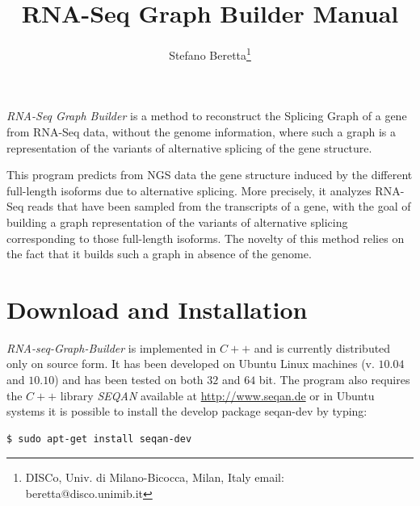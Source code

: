 \documentclass[11pt]{article}
\begin{document}
\newtheorem{theorem}{theorem}[section]
\newtheorem{lemma}[theorem]{Lemma}
\newtheorem{proposition}[theorem]{Proposition}
\newtheorem{observation}[theorem]{Observation}
\newtheorem{corollary}[theorem]{Corollary}
\newtheorem{claim}[theorem]{Claim}
\newtheorem{property}[theorem]{Property}
\theoremstyle{definition}
\newtheorem{definition}[theorem]{Definition}
\newtheorem{problem}{problem}



\title{RNA-Seq Graph Builder Manual}

\author{Stefano Beretta\thanks{%
DISCo, Univ. di Milano-Bicocca, Milan, Italy email: {beretta@disco.unimib.it}}
}


\maketitle

\emph{RNA-Seq Graph Builder} is a method to reconstruct the Splicing
Graph of a gene from RNA-Seq data, without the genome information,
where such a graph is a representation of the variants of alternative
splicing of the gene structure.

This program predicts from NGS data the gene structure induced by the
different full-length isoforms due to alternative splicing. More
precisely, it analyzes RNA-Seq reads that have been sampled from the
transcripts of a gene, with the goal of building a graph
representation of the variants of alternative splicing corresponding
to those full-length isoforms. The novelty of this method relies on
the fact that it builds such a graph in absence of the genome.

\section{Download and Installation}
\emph{RNA-seq-Graph-Builder} is implemented in $C++$ and is currently
distributed only on source form. It has been developed on Ubuntu Linux
machines (v. $10.04$ and $10.10$) and has been tested on both $32$ and
$64$ bit. The program also requires the $C++$ library \emph{SEQAN}
available at \url{http://www.seqan.de} or in Ubuntu systems it is
possible to install the develop package seqan-dev by typing:
\begin{verbatim}
$ sudo apt-get install seqan-dev
\end{verbatim}
\end{document}
